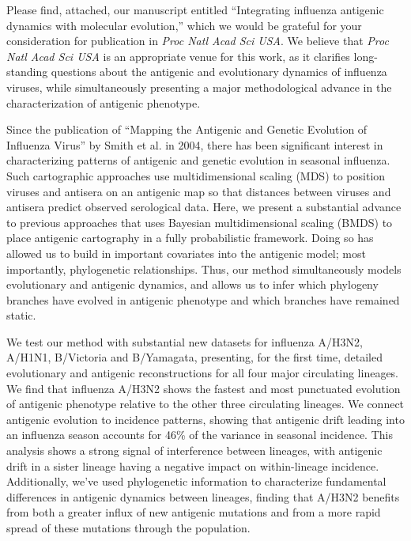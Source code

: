 \documentclass[stdletter,letterpaper,addrfromright,orderfromdateto,dateleft,11pt,noaddrto,sigleft]{newlfm}
\begin{document}
\begin{newlfm}

Please find, attached, our manuscript entitled ``Integrating influenza antigenic dynamics with molecular evolution,'' which we would be grateful for your consideration for publication in \textit{Proc Natl Acad Sci USA}.  
We believe that \textit{Proc Natl Acad Sci USA} is an appropriate venue for this work, as it clarifies long-standing questions about the antigenic and evolutionary dynamics of influenza viruses, while simultaneously presenting a major methodological advance in the characterization of antigenic phenotype.

Since the publication of ``Mapping the Antigenic and Genetic Evolution of Influenza Virus'' by Smith et al. in 2004, there has been significant interest in characterizing patterns of antigenic and genetic evolution in seasonal influenza.
Such cartographic approaches use multidimensional scaling (MDS) to position viruses and antisera on an antigenic map so that distances between viruses and antisera predict observed serological data.
Here, we present a substantial advance to previous approaches that uses Bayesian multidimensional scaling (BMDS) to place antigenic cartography in a fully probabilistic framework.
Doing so has allowed us to build in important covariates into the antigenic model; most importantly, phylogenetic relationships.
Thus, our method simultaneously models evolutionary and antigenic dynamics, and allows us to infer which phylogeny branches have evolved in antigenic phenotype and which branches have remained static.

We test our method with substantial new datasets for influenza A/H3N2, A/H1N1, B/Victoria and B/Yamagata, presenting, for the first time, detailed evolutionary and antigenic reconstructions for all four major circulating lineages.
We find that influenza A/H3N2 shows the fastest and most punctuated evolution of antigenic phenotype relative to the other three circulating lineages.
We connect antigenic evolution to incidence patterns, showing that antigenic drift leading into an influenza season accounts for 46\% of the variance in seasonal incidence.
This analysis shows a strong signal of interference between lineages, with antigenic drift in a sister lineage having a negative impact on within-lineage incidence.
Additionally, we've used phylogenetic information to characterize fundamental differences in antigenic dynamics between lineages, finding that A/H3N2 benefits from both a greater influx of new antigenic mutations and from a more rapid spread of these mutations through the population.


\end{newlfm}
\end{document}
